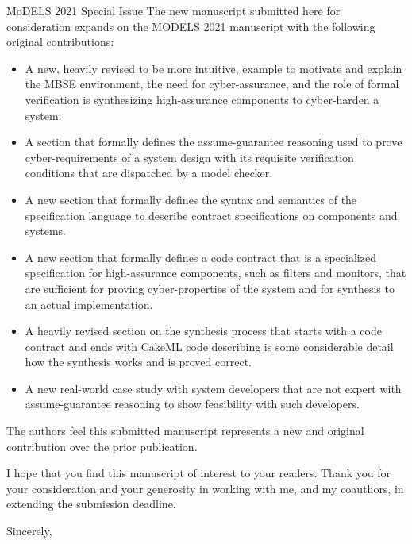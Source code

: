 \documentclass[10pt]{byu-cs}
\begin{document}
\begin{letter}{MoDELS 2021 Special Issue}
The new manuscript submitted here for consideration expands on the MODELS 2021 manuscript with the following original contributions:
\begin{itemize}
    \item A new, heavily revised to be more intuitive, example to motivate and explain the MBSE environment, the need for cyber-assurance, and the role of formal verification is synthesizing high-assurance components to cyber-harden a system.
    \item A section that formally defines the assume-guarantee reasoning used to prove cyber-requirements of a system design with its requisite verification conditions that are dispatched by a model checker.
    \item A new section that formally defines the syntax and semantics of the specification language to describe contract specifications on components and systems.
    \item A new section that formally defines a code contract that is a specialized specification for high-assurance components, such as filters and monitors, that are sufficient for proving cyber-properties of the system and for synthesis to an actual implementation.
    \item A heavily revised section on the synthesis process that starts with a code contract and ends with CakeML code describing is some considerable detail how the synthesis works and is proved correct.
    \item A new real-world case study with system developers that are not expert with assume-guarantee reasoning to show feasibility with such developers. 
\end{itemize} 
The authors feel this submitted manuscript represents a new and original contribution over the prior publication.

I hope that you find this manuscript of interest to your readers. Thank you for your consideration and your generosity in working with me, and my coauthors, in extending the submission deadline.

\closing{Sincerely,}

\end{letter}
\end{document}
